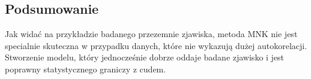 \subsection{Podsumowanie}\label{subsec:podsumowanie}

Jak widać na przykładzie badanego przezemnie zjawiska, metoda MNK nie jest specialnie skuteczna w przypadku danych, które nie wykazują dużej autokorelacji.
Stworzenie modelu, który jednocześnie dobrze oddaje badane zjawisko i jest poprawny statystycznego graniczy z cudem.
